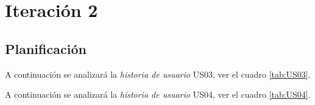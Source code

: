 \section{Iteración 2}
\label{sec:iteracion_2}

%
%


%
%
%


\subsection{Planificación}

A continuación se analizará la \emph{historia de usuario} US03, ver el cuadro \ref{tab:US03}.

    

    



  A continuación se analizará la \emph{historia de usuario} US04, ver el cuadro \ref{tab:US04}.

    

    

